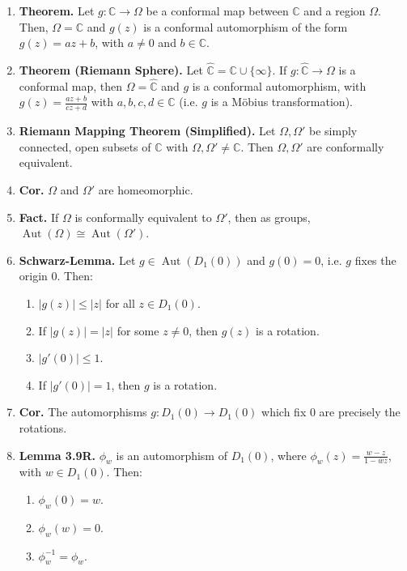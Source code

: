 \documentclass[12pt]{article}
\theoremstyle{definition}
\theoremstyle{named}
\DeclareMathOperator{\Aut}{Aut}
\DeclareMathOperator{\id}{id}
\begin{document}
{\begin{multicols}{2}
\begin{spacing}{1.01}
\begin{enumerate}
\begin{enumerate}
        \item There is an identity map $\id \in \Aut(\Omega)$ such that $\id \circ g(z) = g(z) = g \circ \id(z) = g(z)$. 
    \end{enumerate}
    \item \textbf{Theorem. } Let $g: \mathbb{C} \to \Omega$ be a conformal map between $\mathbb{C}$ and a region $\Omega$. Then, $\Omega = \mathbb{C}$ and $g(z)$ is a conformal automorphism of the form $g(z) = az+b$, with $a \neq 0$ and $b \in \mathbb{C}$. 
    \item \textbf{Theorem (Riemann Sphere). } Let $\hat{\mathbb{C}} = \mathbb{C} \cup \{\infty\}$. If $g: \hat{\mathbb{C}} \to \Omega$ is a conformal map, then $\Omega = \hat{\mathbb{C}}$ and $g$ is a conformal automorphism, with $g(z) = \frac{az+b}{cz+d}$ with $a,b,c,d \in \mathbb{C}$ (i.e. $g$ is a Möbius transformation). 
    \item \textbf{Riemann Mapping Theorem (Simplified). } Let $\Omega,\Omega'$ be simply connected, open subsets of $\mathbb{C}$ with $\Omega,\Omega' \neq \mathbb{C}$. Then $\Omega,\Omega'$ are conformally equivalent. 
    \item \textbf{Cor. } $\Omega$ and $\Omega'$ are homeomorphic. 
    \item \textbf{Fact. } If $\Omega$ is conformally equivalent to $\Omega'$, then as groups, $\Aut(\Omega) \cong \Aut(\Omega')$. 
    \item \textbf{Schwarz-Lemma. } Let $g \in \Aut(D_1(0))$ and $g(0)=0$, i.e. $g$ fixes the origin 0. Then: 
    \begin{enumerate}
        \item $|g(z)| \leq |z|$ for all $z \in D_1(0)$. 
        \item If $|g(z)| = |z|$ for some $z \neq 0$, then $g(z)$ is a rotation. 
        \item $|g'(0)| \leq 1$. 
        \item If $|g'(0)| = 1$, then $g$ is a rotation. 
    \end{enumerate}
    \item \textbf{Cor. } The automorphisms $g: D_1(0) \to D_1(0)$ which fix 0 are precisely the rotations. 
    \item \textbf{Lemma 3.9R. } $\phi_w$ is an automorphism of $D_1(0)$, where $\phi_w(z) = \frac{w-z}{1-\overline{w}z}$, with $w \in D_1(0)$. Then: 
    \begin{enumerate}
        \item $\phi_w(0) = w$. 
        \item $\phi_w(w) = 0$. 
        \item $\phi_w^{-1} = \phi_w$. 
    \end{enumerate}
\end{enumerate}

\end{spacing}
\end{multicols}

}
\end{document}
